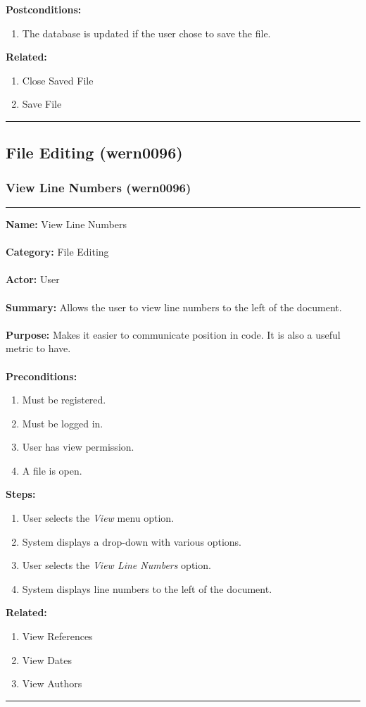 \documentclass[11pt]{report}
\begin{document}
	\textbf{Postconditions:}
	\begin{enumerate}
		\item The database is updated if the user chose to save the file.
	\end{enumerate}
	\textbf{Related:} 
	\begin{enumerate}
		\item Close Saved File
		\item Save File
	\end{enumerate}
\hrule
\vspace{8pt}

\newpage	
		
\subsection{File Editing (wern0096)}
\subsubsection{View Line Numbers (wern0096)}
\vspace{2pt}
\hrule
\vspace{8pt}
	\noindent\textbf{Name:} View Line Numbers \\ \\
	\textbf{Category:} File Editing \\ \\
	\textbf{Actor:} User \\ \\
	\textbf{Summary:} Allows the user to view line numbers to the left of the document. \\ \\
	\textbf{Purpose:} Makes it easier to communicate position in code. It is also a useful metric to have.\\ \\
	\textbf{Preconditions:} 
	\begin{enumerate}
		\item Must be registered.
		\item Must be logged in.
		\item User has view permission.
		\item A file is open.
	\end{enumerate}
	\textbf{Steps:}
	\begin{enumerate}
		\item User selects the \textit{View} menu option.
		\item System displays a drop-down with various options.
		\item User selects the \textit{View Line Numbers} option.
		\item System displays line numbers to the left of the document.
	\end{enumerate}
	\textbf{Related:}
	\begin{enumerate}
		\item View References
		\item View Dates
		\item View Authors
	\end{enumerate}
\hrule
\vspace{8pt}
\end{document}
